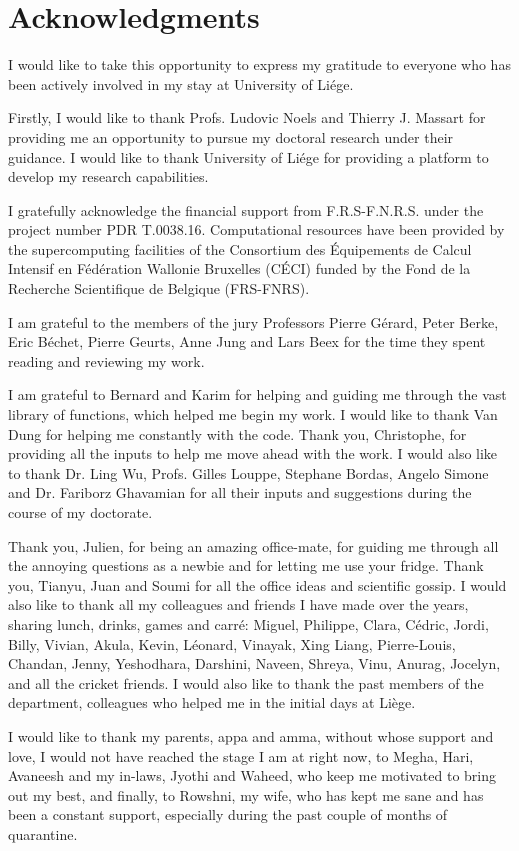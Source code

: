 \chapter*{Acknowledgments}
I would like to take this opportunity to express my gratitude to everyone who has been actively involved in my stay at University of Li\'ege. 

Firstly, I would like to thank Profs. Ludovic Noels and Thierry J. Massart for providing me an opportunity to pursue my doctoral research under their guidance. I would like to thank University of Li\'ege for providing a platform to develop my research capabilities.

I gratefully acknowledge the financial support from F.R.S-F.N.R.S. under the project number PDR T.0038.16. Computational resources have been provided by the supercomputing facilities of the Consortium des Équipements de Calcul Intensif en Fédération Wallonie Bruxelles (CÉCI) funded by the Fond de la Recherche Scientifique de Belgique (FRS-FNRS).

I am grateful to the members of the jury Professors Pierre G\'erard, Peter Berke, Eric B\'echet, Pierre Geurts, Anne Jung and Lars Beex for the time they spent reading and reviewing my work.

I am grateful to Bernard and Karim for helping and guiding me through the vast library of functions, which helped me begin my work. I would like to thank Van Dung for helping me constantly with the code. Thank you, Christophe, for providing all the inputs to help me move ahead with the work. I would also like to thank Dr. Ling Wu, Profs. Gilles Louppe, Stephane Bordas, Angelo Simone and Dr. Fariborz Ghavamian for all their inputs and suggestions during the course of my doctorate. 

Thank you, Julien, for being an amazing office-mate, for guiding me through all the annoying questions as a newbie and for letting me use your fridge. Thank you, Tianyu, Juan and Soumi for all the office ideas and scientific gossip. I would also like to thank all my colleagues and friends I have made over the years, sharing lunch, drinks, games and carr\'e: Miguel, Philippe, Clara, C\'edric, Jordi, Billy, Vivian, Akula, Kevin, L\'eonard, Vinayak, Xing Liang, Pierre-Louis, Chandan, Jenny, Yeshodhara, Darshini, Naveen, Shreya, Vinu, Anurag, Jocelyn, and all the cricket friends. I would also like to thank the past members of the department, colleagues who helped me in the initial days at Li\`ege.

I would like to thank my parents, appa and amma, without whose support and love, I would not have reached the stage I am at right now, to Megha, Hari, Avaneesh and my in-laws, Jyothi and Waheed, who keep me motivated to bring out my best, and finally, to Rowshni, my wife, who has kept me sane and has been a constant support, especially during the past couple of months of quarantine.
